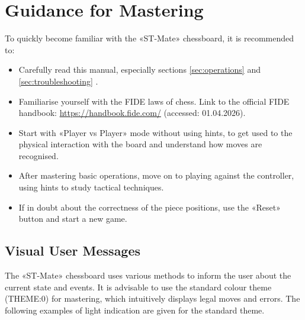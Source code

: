 \documentclass[a4paper,12pt]{article}
\begin{document}
\section{Guidance for Mastering}
\label{sec:usage}
To quickly become familiar with the «ST-Mate» chessboard, it is recommended to:
\begin{itemize}
    \item Carefully read this manual, especially sections \ref{sec:operations}  and \ref{sec:troubleshooting} .
    \item Familiarise yourself with the FIDE laws of chess. Link to the official FIDE handbook: \url{https://handbook.fide.com/} (accessed: 01.04.2026).
    \item Start with «Player vs Player» mode without using hints, to get used to the physical interaction with the board and understand how moves are recognised.
    \item After mastering basic operations, move on to playing against the controller, using hints to study tactical techniques.
    \item If in doubt about the correctness of the piece positions, use the «Reset» button and start a new game.
\end{itemize}

\subsection{Visual User Messages}

The «ST-Mate» chessboard uses various methods to inform the user about the current state and events.
It is advisable to use the standard colour theme (THEME:0) for mastering, which intuitively displays legal moves and errors.
The following examples of light indication are given for the standard theme.
\end{document}
